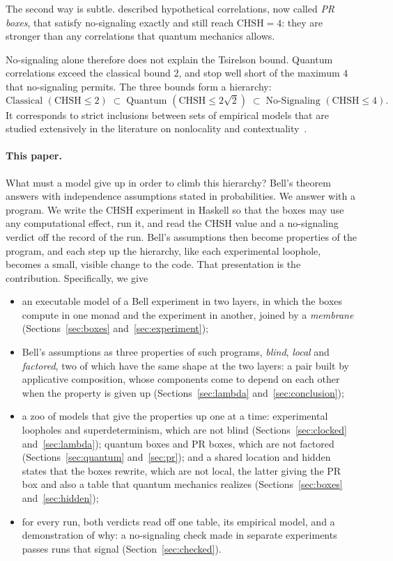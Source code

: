 \documentclass[11pt]{article}
\newcommand{\CHSH}{\mathrm{CHSH}}
\begin{document}
The second way is subtle. \citet{PopescuRohrlich1994} described hypothetical correlations, now called \emph{PR boxes}, that satisfy no-signaling exactly and still reach $\CHSH = 4$: they are stronger than any correlations that quantum mechanics allows.

No-signaling alone therefore does not explain the Tsirelson bound. Quantum correlations exceed the classical bound $2$, and stop well short of the maximum $4$ that no-signaling permits. The three bounds form a hierarchy:
\[
  \text{Classical } (\CHSH \le 2) \;\subset\; \text{Quantum } (\CHSH \le 2\sqrt2) \;\subset\; \text{No-Signaling } (\CHSH \le 4).
\]
It corresponds to strict inclusions between sets of empirical models that are studied extensively in the literature on nonlocality and contextuality~\citep{Abramsky2013,AbramskyBrandenburger2011}.

\paragraph{This paper.} What must a model give up in order to climb this hierarchy? Bell's theorem answers with independence assumptions stated in probabilities. We answer with a program. We write the CHSH experiment in Haskell so that the boxes may use any computational effect, run it, and read the CHSH value and a no-signaling verdict off the record of the run. Bell's assumptions then become properties of the program, and each step up the hierarchy, like each experimental loophole, becomes a small, visible change to the code. That presentation is the contribution. Specifically, we give
\begin{itemize}
\item an executable model of a Bell experiment in two layers, in which the boxes compute in one monad and the experiment in another, joined by a \emph{membrane} (Sections~\ref{sec:boxes} and~\ref{sec:experiment});
\item Bell's assumptions as three properties of such programs, \emph{blind}, \emph{local} and \emph{factored}, two of which have the same shape at the two layers: a pair built by applicative composition, whose components come to depend on each other when the property is given up (Sections~\ref{sec:lambda} and~\ref{sec:conclusion});
\item a zoo of models that give the properties up one at a time: experimental loopholes and superdeterminism, which are not blind (Sections~\ref{sec:clocked} and~\ref{sec:lambda}); quantum boxes and PR boxes, which are not factored (Sections~\ref{sec:quantum} and~\ref{sec:pr}); and a shared location and hidden states that the boxes rewrite, which are not local, the latter giving the PR box and also a table that quantum mechanics realizes (Sections~\ref{sec:boxes} and~\ref{sec:hidden});
\item for every run, both verdicts read off one table, its empirical model, and a demonstration of why: a no-signaling check made in separate experiments passes runs that signal (Section~\ref{sec:checked}).
\end{itemize}
\end{document}
